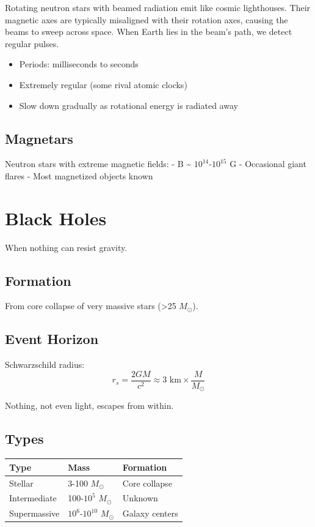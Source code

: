 \documentclass[
  11pt,
  letterpaper,
  twoside,
  openright]{book}
\providecommand{\tightlist}{%
  \setlength{\itemsep}{0pt}\setlength{\parskip}{0pt}}
\begin{document}
Rotating neutron stars with beamed radiation emit like cosmic
lighthouses. Their magnetic axes are typically misaligned with their
rotation axes, causing the beams to sweep across space. When Earth lies
in the beam's path, we detect regular pulses.

\begin{itemize}
\tightlist
\item
  Periods: milliseconds to seconds
\item
  Extremely regular (some rival atomic clocks)
\item
  Slow down gradually as rotational energy is radiated away
\end{itemize}

\subsection{Magnetars}\label{magnetars}

Neutron stars with extreme magnetic fields: - B \textasciitilde{}
\(10^{14}\)-\(10^{15}\) G - Occasional giant flares - Most magnetized
objects known

\section{Black Holes}\label{black-holes}

When nothing can resist gravity.

\subsection{Formation}\label{formation-3}

From core collapse of very massive stars (\textgreater25 \(M_\odot\)).

\subsection{Event Horizon}\label{event-horizon}

Schwarzschild radius: \[
r_s = \frac{2GM}{c^2} \approx 3 \text{ km} \times \frac{M}{M_\odot}
\]

Nothing, not even light, escapes from within.

\subsection{Types}\label{types-1}

\begin{longtable}[]{@{}lll@{}}
\toprule\noalign{}
Type & Mass & Formation \\
\midrule\noalign{}
\endhead
\bottomrule\noalign{}
\endlastfoot
Stellar & 3-100 \(M_\odot\) & Core collapse \\
Intermediate & 100-\(10^5\) \(M_\odot\) & Unknown \\
Supermassive & \(10^6\)-\(10^{10}\) \(M_\odot\) & Galaxy centers \\
\end{longtable}
\end{document}
